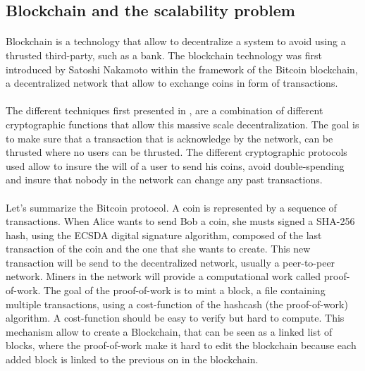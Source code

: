 \documentclass[11pt,a4paper]{article}
\begin{document}
\subsection{Blockchain and the scalability problem}


\paragraph{}


Blockchain is a technology that allow to decentralize a
system to avoid using a thrusted third-party, such as a bank.
The blockchain technology was first introduced by
Satoshi Nakamoto \cite{bitcoin} within the framework
of the Bitcoin blockchain, a decentralized network
that allow to exchange coins in form of transactions.

\paragraph{}

The different techniques first presented in \cite{bitcoin}, are
a combination of different cryptographic functions that allow
this massive scale decentralization. The goal is to make
sure that a transaction that is acknowledge by the network,
can be thrusted where no users can be thrusted.
The different cryptographic protocols used allow to insure
the will of a user to send his coins, avoid double-spending and
insure that nobody in the network can change any past transactions.


\paragraph{}

Let's summarize the Bitcoin protocol. A coin is represented by
a sequence of transactions. When Alice wants to send Bob a coin,
she musts signed a SHA-256 hash, using the ECSDA digital signature
algorithm, composed of the last transaction of the coin
and the one that she wants to create. This new transaction
will be send to the decentralized network,
usually a peer-to-peer network. Miners in the network
will provide a computational work called proof-of-work.
The goal of the proof-of-work is to mint a block, a
file containing multiple transactions, using a cost-function
of the hashcash \cite{hashcash} (the proof-of-work) algorithm.
A cost-function should be easy to verify but hard to compute.
This mechanism allow to create a Blockchain, that can be seen
as a linked list of blocks, where the proof-of-work make it
hard to edit the blockchain because each added block
is linked to the previous on in the blockchain.
\end{document}
